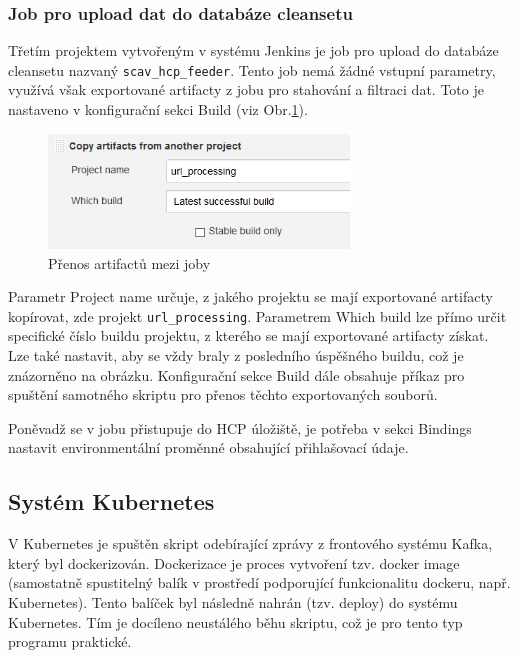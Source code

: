 \documentclass[thesis=M,czech,hidelinks]{FITthesis}[2013/05/06]
\begin{document}
\subsubsection{Job pro upload dat do databáze cleansetu}
Třetím projektem vytvořeným v systému Jenkins je job pro upload do databáze cleansetu nazvaný \texttt{scav_hcp_feeder}. Tento job nemá žádné vstupní parametry, využívá však exportované artifacty z jobu pro stahování a filtraci dat. Toto je nastaveno v konfigurační sekci Build (viz Obr.\ref{fig:jenkins_artifacts}). 

\begin{figure}[h]
	\centering
	\includegraphics[width=8cm]{pictures/jenkins_artifacts.png}
	\caption{Přenos artifactů mezi joby}
	\label{fig:jenkins_artifacts}
\end{figure}

Parametr Project name určuje, z jakého projektu se mají exportované artifacty kopírovat, zde projekt \texttt{url_processing}. Parametrem Which build lze přímo určit specifické číslo buildu projektu, z kterého se mají exportované artifacty získat. Lze také nastavit, aby se vždy braly z posledního úspěšného buildu, což je znázorněno na obrázku. Konfigurační sekce Build dále obsahuje příkaz pro spuštění samotného skriptu pro přenos těchto exportovaných souborů. 

Poněvadž se v jobu přistupuje do HCP úložiště, je potřeba v sekci Bindings nastavit environmentální proměnné obsahující přihlašovací údaje.



\subsection{Systém Kubernetes}\label{sec:luft}
V Kubernetes je spuštěn skript odebírající zprávy z frontového systému Kafka, který byl dockerizován. Dockerizace je proces vytvoření tzv. docker image (samostatně spustitelný balík v prostředí podporující funkcionalitu dockeru, např. Kubernetes). Tento balíček byl následně nahrán (tzv. deploy) do systému Kubernetes. Tím je docíleno neustálého běhu skriptu, což je pro tento typ programu praktické.
\end{document}
